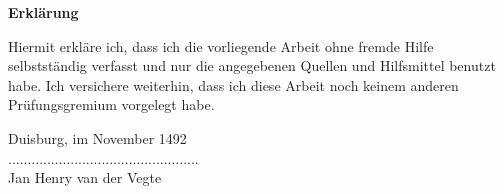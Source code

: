 \begin{center}
\Large{\textsf{\textbf{Erklärung}}}
\end{center}
\vspace{0.8cm}
Hiermit erkläre ich, dass ich die vorliegende Arbeit ohne fremde Hilfe selbstständig
verfasst und nur die angegebenen Quellen und Hilfsmittel benutzt habe. Ich versichere
weiterhin, dass ich diese Arbeit noch keinem anderen Prüfungsgremium vorgelegt habe.

Duisburg, im November 1492
\\[1cm]
.................................................\\[0.2cm]
Jan Henry van der Vegte